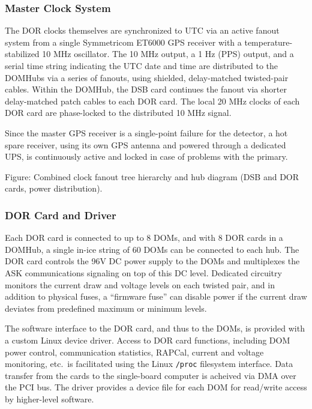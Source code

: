 \subsubsection{\label{sect:online:master_clock}Master Clock System}

The DOR clocks themselves are synchronized to UTC via an active fanout
system from a single Symmetricom ET6000 GPS receiver with a
temperature-stabilized 10 MHz oscillator.  The 10 MHz output, a 1 Hz (PPS)
output, and a serial time string indicating the UTC date and time are distributed
to the DOMHubs via a series of fanouts, using shielded, delay-matched
twisted-pair cables.  Within the DOMHub, the DSB card continues the fanout
via shorter delay-matched patch cables to each DOR card.  The local 20 MHz
clocks of each DOR card are phase-locked to the distributed 10 MHz signal.

Since the master GPS receiver is a single-point failure for the detector, a
hot spare receiver, using its own GPS antenna and powered through a
dedicated UPS, is continuously active and locked in case of problems with
the primary.  

Figure: Combined clock fanout tree hierarchy and hub diagram (DSB and DOR
cards, power distribution).


\subsubsection{DOR Card and Driver}

Each DOR card is connected to up to 8 DOMs, and with 8 DOR cards in a
DOMHub, a single in-ice string of 60 DOMs can be connected to each hub. The
DOR card controls the 96V DC power supply to the DOMs and multiplexes the
ASK communications signaling on top of this DC level.  Dedicated circuitry
monitors the current draw and voltage levels on each twisted pair, and in
addition to physical fuses, a ``firmware fuse'' can disable power if the
current draw deviates from predefined maximum or minimum levels.

The software interface to the DOR card, and thus to the DOMs, is provided
with a custom Linux device driver.  Access to DOR card functions,
including DOM power control, communication statistics, RAPCal, current and
voltage monitoring, etc.~is facilitated using the Linux \texttt{/proc}
filesystem interface.  Data transfer from the cards to the single-board
computer is acheived via DMA over the PCI bus.  The driver provides a
device file for each DOM for read/write access by higher-level software.

